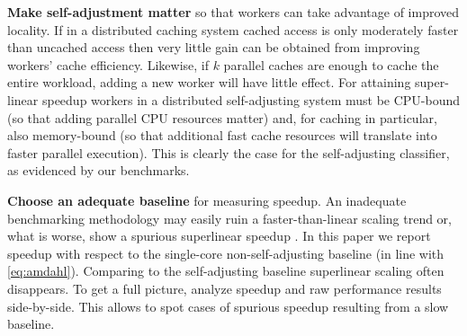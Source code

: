\noindent%
\textbf{Make self-adjustment matter} so that workers can take advantage of improved locality. If in a distributed caching system cached access is only moderately faster than uncached access then very little gain can be obtained from improving workers' cache efficiency. Likewise, if $k$ parallel caches are enough to cache the entire workload, adding a new worker will have little effect. For attaining super-linear speedup workers in a distributed self-adjusting system must be CPU-bound (so that adding parallel CPU resources matter) and, for caching in particular, also memory-bound (so that additional fast cache resources will translate into faster parallel execution). This is clearly the case for the self-adjusting classifier, as evidenced by our benchmarks.

\noindent%
\textbf{Choose an adequate baseline} for measuring speedup. An inadequate benchmarking methodology may easily ruin a faster-than-linear scaling trend or, what is worse, show a spurious superlinear speedup \cite{10.1145/2773212.2789974}. In this paper we report speedup with respect to the single-core non-self-adjusting baseline (in line with \eqref{eq:amdahl}). Comparing to the self-adjusting baseline superlinear scaling often disappears. To get a full picture, analyze speedup and raw performance results side-by-side. This allows to spot cases of spurious speedup resulting from a slow baseline.


